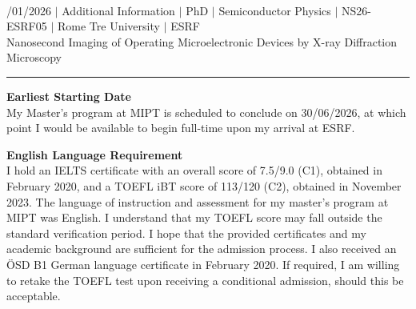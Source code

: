 \documentclass[a4paper,12pt]{article}
\begin{document}
{\centering
  {\scshape {}} \\ 
  {\fontsize{10}{10}/01/2026} $|$
  {\fontsize{10}{10}\selectfont Additional Information} $|$
  {\fontsize{10}{10}\selectfont PhD} $|$
  {\fontsize{10}{10}\selectfont Semiconductor Physics} $|$
  {\fontsize{10}{10}\selectfont NS26-ESRF05} $|$
  {\fontsize{10}{10}\selectfont Rome Tre University} $|$
  {\fontsize{10}{10}\selectfont ESRF} \\
  {\fontsize{10}{10}\selectfont Nanosecond Imaging of Operating Microelectronic Devices by X-ray Diffraction Microscopy}
\par}
\vspace{-15pt}
\noindent\rule{\textwidth}{0.5pt}

\vspace{-10pt}

\noindent \textbf{Earliest Starting Date}\\
My Master's program at MIPT is scheduled to conclude on 30/06/2026, at which point I would be available to begin full-time upon my arrival at ESRF.

\noindent \textbf{English Language Requirement}\\
I hold an IELTS certificate with an overall score of 7.5/9.0 (C1), obtained in February 2020, and a TOEFL iBT score of 113/120 (C2), obtained in November 2023. The language of instruction and assessment for my master's program at MIPT was English. I understand that my TOEFL score may fall outside the standard verification period. I hope that the provided certificates and my academic background are sufficient for the admission process. I also received an ÖSD B1 German language certificate in February 2020. If required, I am willing to retake the TOEFL test upon receiving a conditional admission, should this be acceptable.
\end{document}

